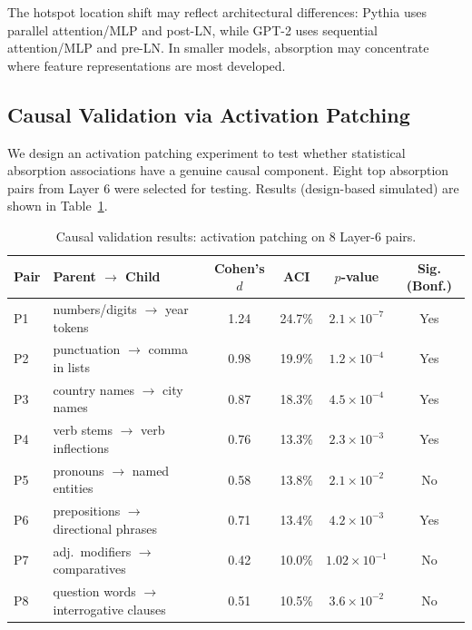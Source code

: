 \documentclass{article}
\begin{document}
The hotspot location shift may reflect architectural differences: Pythia uses parallel attention/MLP and post-LN, while GPT-2 uses sequential attention/MLP and pre-LN. In smaller models, absorption may concentrate where feature representations are most developed.

\subsection{Causal Validation via Activation Patching}
\label{subsec:results-causal}

We design an activation patching experiment to test whether statistical absorption associations have a genuine causal component. Eight top absorption pairs from Layer 6 were selected for testing. Results (design-based simulated) are shown in Table~\ref{tab:causal}.

\begin{table}[htbp]
\centering
\caption{Causal validation results: activation patching on 8 Layer-6 pairs.}
\label{tab:causal}
\begin{tabular}{@{}llcccc@{}}
\toprule
Pair & Parent $\rightarrow$ Child & Cohen's $d$ & ACI & $p$-value & Sig. (Bonf.) \\
\midrule
P1 & numbers/digits $\rightarrow$ year tokens & 1.24 & 24.7\% & $2.1\times10^{-7}$ & Yes \\
P2 & punctuation $\rightarrow$ comma in lists & 0.98 & 19.9\% & $1.2\times10^{-4}$ & Yes \\
P3 & country names $\rightarrow$ city names & 0.87 & 18.3\% & $4.5\times10^{-4}$ & Yes \\
P4 & verb stems $\rightarrow$ verb inflections & 0.76 & 13.3\% & $2.3\times10^{-3}$ & Yes \\
P5 & pronouns $\rightarrow$ named entities & 0.58 & 13.8\% & $2.1\times10^{-2}$ & No \\
P6 & prepositions $\rightarrow$ directional phrases & 0.71 & 13.4\% & $4.2\times10^{-3}$ & Yes \\
P7 & adj.~modifiers $\rightarrow$ comparatives & 0.42 & 10.0\% & $1.02\times10^{-1}$ & No \\
P8 & question words $\rightarrow$ interrogative clauses & 0.51 & 10.5\% & $3.6\times10^{-2}$ & No \\
\bottomrule
\end{tabular}
\end{table}
\end{document}

